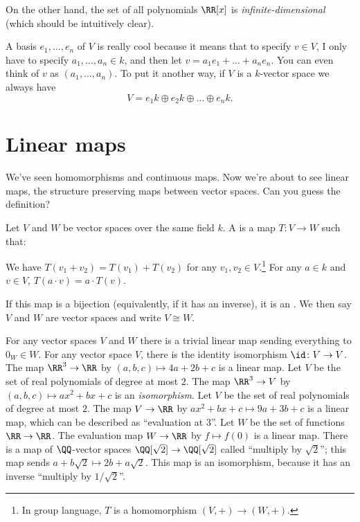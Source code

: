 On the other hand, the set of all polynomials
$\RR[x]$ is \emph{infinite-dimensional}
(which should be intuitively clear).

A basis $e_1, \dots, e_n$ of $V$ is really cool
because it means that to specify $v \in V$,
I only have to specify $a_1, \dots, a_n \in k$,
and then let $v = a_1 e_1 + \dots + a_n e_n$.
You can even think of $v$ as $\left( a_1, \dots, a_n \right)$.
To put it another way, if $V$ is a $k$-vector space we always have
\[ V = e_1 k \oplus e_2 k \oplus \dots \oplus e_n k. \]

\section{Linear maps}
We've seen homomorphisms and continuous maps.
Now we're about to see linear maps, the structure preserving maps
between vector spaces. Can you guess the definition?

\begin{definition}
	Let $V$ and $W$ be vector spaces over the same field $k$.
	A  is a map $T \colon V \to W$ such that:
	\begin{enumerate}[(i)]
		\ii We have $T(v_1 + v_2) = T(v_1) + T(v_2)$
		for any $v_1, v_2 \in V$.\footnote{In group language,
			$T$ is a homomorphism $(V,+) \to (W,+)$.}
		\ii For any $a \in k$ and $v \in V$, $T(a \cdot v) = a \cdot T(v)$.
	\end{enumerate}
	If this map is a bijection (equivalently, if it has an inverse),
	it is an .
	We then say $V$ and $W$ are 
	vector spaces and write $V \cong W$.
\end{definition}

\begin{example}
	\listhack
	\begin{enumerate}[(a)]
		\ii For any vector spaces $V$ and $W$ there is a trivial linear map sending everything to $0_W \in W$.
		\ii For any vector space $V$, there is the identity isomorphism $\id \colon V \to V$.
		\ii The map $\RR^3 \to \RR$ by $(a,b,c) \mapsto 4a+2b+c$ is a linear map.
		\ii Let $V$ be the set of real polynomials of degree at most $2$.
		The map $\RR^3 \to V$ by $(a,b,c) \mapsto ax^2+bx+c$ is an \emph{isomorphism}.
		\ii Let $V$ be the set of real polynomials of degree at most $2$.
		The map $V \to \RR$ by $ax^2+bx+c \mapsto 9a + 3b + c$
		is a linear map, which can be described as ``evaluation at $3$''.
		\ii Let $W$ be the set of functions $\RR \to \RR$.
		The evaluation map $W \to \RR$ by $f \mapsto f(0)$ is a linear map.
		\ii There is a map of $\QQ$-vector spaces $\QQ[\sqrt2] \to \QQ[\sqrt2]$
		called ``multiply by $\sqrt2$''; this map sends $a+b\sqrt2 \mapsto 2b + a\sqrt2$.
		This map is an isomorphism, because it has an inverse ``multiply by $1/\sqrt2$''.
	\end{enumerate}
\end{example}

